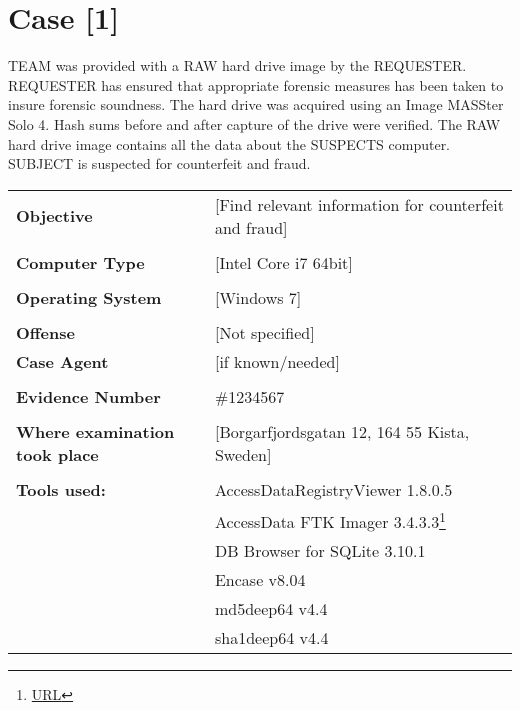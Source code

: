 \setlength\headsep{10pt}
\section{Case [1]}

TEAM was provided with a RAW hard drive image by the REQUESTER. 
REQUESTER has ensured that appropriate forensic measures has been taken to insure forensic soundness. The hard drive was acquired
using an Image MASSter Solo 4. Hash sums before and after capture of the drive were verified.
The RAW hard drive image contains all the data about the SUSPECTS computer.
SUBJECT is suspected for counterfeit and fraud.  


\begin{longtable}{p{}p{}}
\textbf{Objective} & [Find relevant information for counterfeit and fraud]\\
&\\
\textbf{Computer Type} & [Intel Core i7 64bit]\\
&\\
\textbf{Operating System} & [Windows 7]\\
&\\
\textbf{Offense} & [Not specified]\\
\textbf{Case Agent} & [if known/needed]\\
&\\
\textbf{Evidence Number} &  \#1234567\\
&\\
\textbf{Where examination took place} &  [Borgarfjordsgatan 12, 164 55 Kista, Sweden] \\
&\\
\textbf{Tools used:} & 	AccessDataRegistryViewer 1.8.0.5 \\ 
 &						AccessData FTK Imager 3.4.3.3\footnote{\url{URL}} \\
 &						DB Browser for SQLite 3.10.1 \\
 &						Encase v8.04 \\
 &						md5deep64 v4.4 \\
 &						sha1deep64 v4.4 \\
\end{longtable}

\newpage
